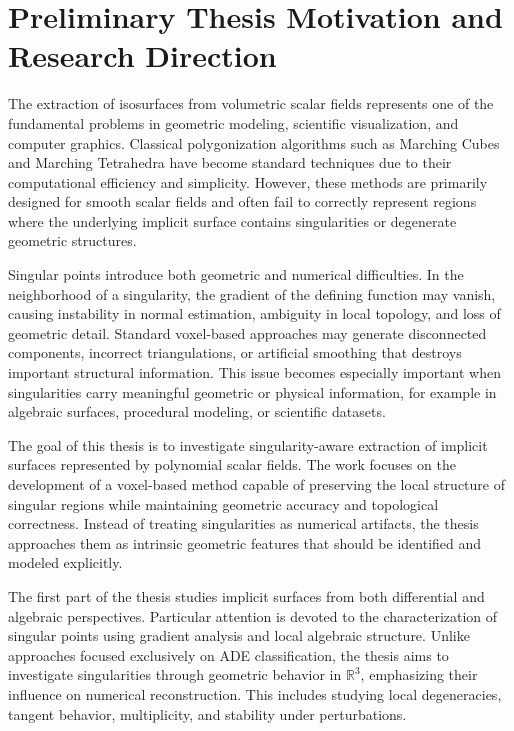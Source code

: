 \documentclass[12pt,a4paper]{article}
\begin{document}
\newpage

\section*{Preliminary Thesis Motivation and Research Direction}

The extraction of isosurfaces from volumetric scalar fields represents one of the fundamental problems in geometric modeling, scientific visualization, and computer graphics. Classical polygonization algorithms such as Marching Cubes and Marching Tetrahedra have become standard techniques due to their computational efficiency and simplicity. However, these methods are primarily designed for smooth scalar fields and often fail to correctly represent regions where the underlying implicit surface contains singularities or degenerate geometric structures.

Singular points introduce both geometric and numerical difficulties. In the neighborhood of a singularity, the gradient of the defining function may vanish, causing instability in normal estimation, ambiguity in local topology, and loss of geometric detail. Standard voxel-based approaches may generate disconnected components, incorrect triangulations, or artificial smoothing that destroys important structural information. This issue becomes especially important when singularities carry meaningful geometric or physical information, for example in algebraic surfaces, procedural modeling, or scientific datasets.

The goal of this thesis is to investigate singularity-aware extraction of implicit surfaces represented by polynomial scalar fields. The work focuses on the development of a voxel-based method capable of preserving the local structure of singular regions while maintaining geometric accuracy and topological correctness. Instead of treating singularities as numerical artifacts, the thesis approaches them as intrinsic geometric features that should be identified and modeled explicitly.

The first part of the thesis studies implicit surfaces from both differential and algebraic perspectives. Particular attention is devoted to the characterization of singular points using gradient analysis and local algebraic structure. Unlike approaches focused exclusively on ADE classification, the thesis aims to investigate singularities through geometric behavior in $\mathbb{R}^3$, emphasizing their influence on numerical reconstruction. This includes studying local degeneracies, tangent behavior, multiplicity, and stability under perturbations.
\end{document}
